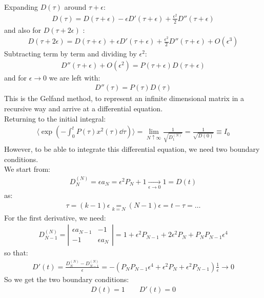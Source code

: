 \documentclass[../template.tex]{subfiles}
\begin{document}
Expanding $D(\tau)$ around $\tau + \epsilon$:
\begin{align*}
    D(\tau) = D(\tau + \epsilon) - \epsilon D'(\tau + \epsilon) + \frac{\epsilon^2}{2} D''(\tau + \epsilon) 
\end{align*}  
and also for $D(\tau + 2\epsilon)$ :
\begin{align*}
    D(\tau + 2\epsilon) = D(\tau + \epsilon) + \epsilon D'(\tau + \epsilon) + \frac{\epsilon^2}{2} D''(\tau + \epsilon) + O(\epsilon^3)  
\end{align*}
Subtracting term by term and dividing by $\epsilon^2$: 
\begin{align*}
    D''(\tau + \epsilon) + O(\epsilon^2) = P(\tau + \epsilon) D(\tau + \epsilon)
\end{align*}
and for $\epsilon \to 0$ we are left with:
\begin{align*}
    D''(\tau) = P(\tau) D(\tau)
\end{align*} 
This is the Gelfand method, to represent an infinite dimensional matrix in a recursive way and arrive at a differential equation.\\
Returning to the initial integral:
\begin{align*}
    \langle \exp\left(-\int_0^t P(\tau) x^2(\tau) \dd{\tau}\right) \rangle = \lim_{N \uparrow \infty} \frac{1}{\sqrt{D_1^{(N)}}} = \frac{1}{\sqrt{D(0) }}  \equiv I_0
\end{align*}
However, to be able to integrate this differential equation, we need two boundary conditions.\\
We start from:
\begin{align*}
    D_N^{(N)} = \epsilon a_N = \epsilon^2 P_N + 1  \xrightarrow[\epsilon \to 0]{}   1 = D(t)
\end{align*}
as:
\begin{align*}
    \tau = (k-1)\epsilon \underset{k=N}{=} (N-1)\epsilon = t- \tau = \dots 
\end{align*}
For the first derivative, we need:
\begin{align*}
    D_{N-1}^{(N)} = \left|\begin{array}{cc}
    \epsilon a_{N-1} & -1 \\ 
    -1 & \epsilon a_N
    \end{array}\right| = 1 + \epsilon^2 P_{N-1} + 2 \epsilon^2 P_N + P_N P_{N-1} \epsilon^4
\end{align*}
so that:
\begin{align*}
    D'(t) = \frac{D^{(N)}_N - D^{(N)}_{N-1}}{\epsilon} = -(P_N P_{N-1} \epsilon^4 + \epsilon^2 P_N + \epsilon^2 P_{N-1}) \frac{1}{\epsilon} \to 0  
\end{align*}
So we get the two boundary conditions:
\begin{align*}
    D(t) = 1 \qquad D'(t) = 0
\end{align*}
\end{document}

